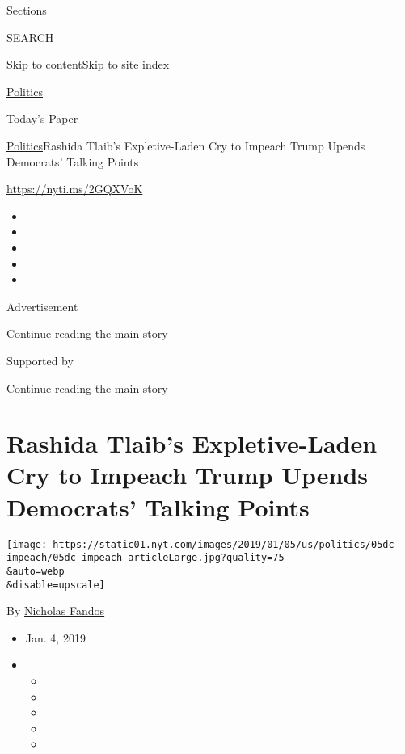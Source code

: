 Sections

SEARCH

\protect\hyperlink{site-content}{Skip to
content}\protect\hyperlink{site-index}{Skip to site index}

\href{https://www.nytimes.com/section/politics}{Politics}

\href{https://myaccount.nytimes.com/auth/login?response_type=cookie\&client_id=vi}{}

\href{https://www.nytimes.com/section/todayspaper}{Today's Paper}

\href{/section/politics}{Politics}\textbar{}Rashida Tlaib's
Expletive-Laden Cry to Impeach Trump Upends Democrats' Talking Points

\url{https://nyti.ms/2GQXVoK}

\begin{itemize}
\item
\item
\item
\item
\item
\end{itemize}

Advertisement

\protect\hyperlink{after-top}{Continue reading the main story}

Supported by

\protect\hyperlink{after-sponsor}{Continue reading the main story}

\hypertarget{rashida-tlaibs-expletive-laden-cry-to-impeach-trump-upends-democrats-talking-points}{%
\section{Rashida Tlaib's Expletive-Laden Cry to Impeach Trump Upends
Democrats' Talking
Points}\label{rashida-tlaibs-expletive-laden-cry-to-impeach-trump-upends-democrats-talking-points}}

\texttt{[image: https://static01.nyt.com/images/2019/01/05/us/politics/05dc-impeach/05dc-impeach-articleLarge.jpg?quality=75\\\&auto=webp\\\&disable=upscale]}

By \href{https://www.nytimes.com/by/nicholas-fandos}{Nicholas Fandos}

\begin{itemize}
\item
  Jan. 4, 2019
\item
  \begin{itemize}
  \item
  \item
  \item
  \item
  \item
  \end{itemize}
\end{itemize}

